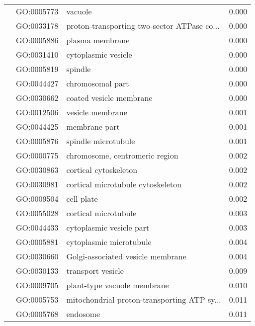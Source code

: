\begin{longtable}{lllr}
   & GO:0005773 &                                      vacuole &         0.000 \\
   & GO:0033178 &  proton-transporting two-sector ATPase co... &         0.000 \\
   & GO:0005886 &                              plasma membrane &         0.000 \\
   & GO:0031410 &                          cytoplasmic vesicle &         0.000 \\
   & GO:0005819 &                                      spindle &         0.000 \\
   & GO:0044427 &                             chromosomal part &         0.000 \\
   & GO:0030662 &                      coated vesicle membrane &         0.000 \\
   & GO:0012506 &                             vesicle membrane &         0.001 \\
   & GO:0044425 &                                membrane part &         0.001 \\
   & GO:0005876 &                          spindle microtubule &         0.001 \\
   & GO:0000775 &               chromosome, centromeric region &         0.002 \\
   & GO:0030863 &                        cortical cytoskeleton &         0.002 \\
   & GO:0030981 &            cortical microtubule cytoskeleton &         0.002 \\
   & GO:0009504 &                                   cell plate &         0.002 \\
   & GO:0055028 &                         cortical microtubule &         0.003 \\
   & GO:0044433 &                     cytoplasmic vesicle part &         0.003 \\
   & GO:0005881 &                      cytoplasmic microtubule &         0.004 \\
   & GO:0030660 &            Golgi-associated vesicle membrane &         0.004 \\
   & GO:0030133 &                            transport vesicle &         0.009 \\
   & GO:0009705 &                  plant-type vacuole membrane &         0.010 \\
   & GO:0005753 &  mitochondrial proton-transporting ATP sy... &         0.011 \\
   & GO:0005768 &                                     endosome &         0.011 \\

\end{longtable}
